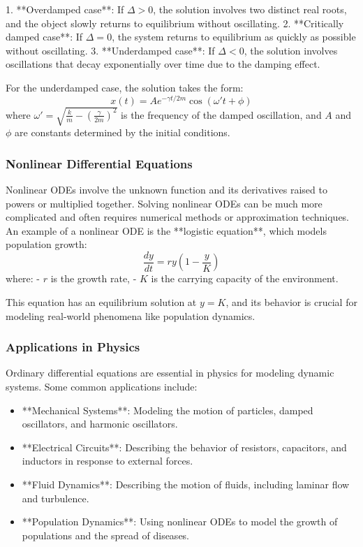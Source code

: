 \documentclass{article}
\begin{document}
1. **Overdamped case**: If \( \Delta > 0 \), the solution involves two distinct real roots, and the object slowly returns to equilibrium without oscillating.
2. **Critically damped case**: If \( \Delta = 0 \), the system returns to equilibrium as quickly as possible without oscillating.
3. **Underdamped case**: If \( \Delta < 0 \), the solution involves oscillations that decay exponentially over time due to the damping effect.

For the underdamped case, the solution takes the form:
\[
x(t) = A e^{-\gamma t / 2m} \cos(\omega' t + \phi)
\]
where \( \omega' = \sqrt{\frac{k}{m} - \left( \frac{\gamma}{2m} \right)^2} \) is the frequency of the damped oscillation, and \( A \) and \( \phi \) are constants determined by the initial conditions.

\subsubsection*{Nonlinear Differential Equations}

Nonlinear ODEs involve the unknown function and its derivatives raised to powers or multiplied together. Solving nonlinear ODEs can be much more complicated and often requires numerical methods or approximation techniques. An example of a nonlinear ODE is the **logistic equation**, which models population growth:
\[
\frac{dy}{dt} = ry(1 - \frac{y}{K})
\]
where:
- \( r \) is the growth rate,
- \( K \) is the carrying capacity of the environment.

This equation has an equilibrium solution at \( y = K \), and its behavior is crucial for modeling real-world phenomena like population dynamics.

\subsubsection*{Applications in Physics}

Ordinary differential equations are essential in physics for modeling dynamic systems. Some common applications include:
\begin{itemize}
    \item **Mechanical Systems**: Modeling the motion of particles, damped oscillators, and harmonic oscillators.
    \item **Electrical Circuits**: Describing the behavior of resistors, capacitors, and inductors in response to external forces.
    \item **Fluid Dynamics**: Describing the motion of fluids, including laminar flow and turbulence.
    \item **Population Dynamics**: Using nonlinear ODEs to model the growth of populations and the spread of diseases.
\end{itemize}
\end{document}

